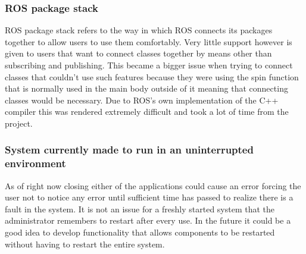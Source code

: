       \subsubsection{ROS package stack}
        ROS package stack refers to the way in which ROS connects its packages together to allow users to use them comfortably. Very little support however is given to users that want to connect classes together by means other than subscribing and publishing. This became a bigger issue when trying to connect classes that couldn't use such features because they were using the spin function that is normally used in the main body outside of it meaning that connecting classes would be necessary. Due to ROS's own implementation of the C++ compiler this was rendered extremely difficult and took a lot of time from the project.

      \subsubsection{System currently made to run in an uninterrupted environment}
        As of right now closing either of the applications could cause an error forcing the user not to notice any error until sufficient time has passed to realize there is a fault in the system. It is not an issue for a freshly started system that the administrator remembers to restart after every use. In the future it could be a good idea to develop functionality that allows components to be restarted without having to restart the entire system.
